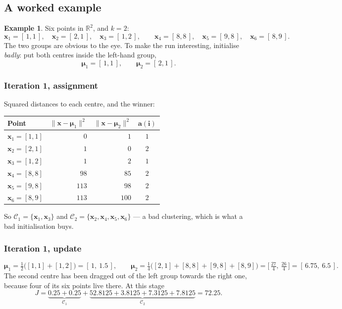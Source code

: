 \documentclass[11pt]{article}
\theoremstyle{plain}
\theoremstyle{definition}
\newtheorem{ex}{Example}[section]
\theoremstyle{remark}
\newcommand{\R}{\mathbb{R}}
\newcommand{\vc}[1]{\mathbf{#1}}
\newcommand{\norm}[1]{\lVert #1\rVert}
\newcommand{\Cl}{\mathcal{C}}
\newcommand{\bmu}{\boldsymbol{\mu}}
\begin{document}
\subsection{A worked example}
\begin{ex}
Six points in $\R^{2}$, and $k=2$:
\[
  \vc{x}_1=[\,1,1\,],\quad \vc{x}_2=[\,2,1\,],\quad \vc{x}_3=[\,1,2\,],
  \qquad
  \vc{x}_4=[\,8,8\,],\quad \vc{x}_5=[\,9,8\,],\quad \vc{x}_6=[\,8,9\,].
\]
The two groups are obvious to the eye. To make the run interesting, initialise
\emph{badly}: put both centres inside the left-hand group,
\[
  \bmu_1 = [\,1,1\,], \qquad \bmu_2 = [\,2,1\,] .
\]

\subsubsection*{Iteration 1, assignment}
Squared distances to each centre, and the winner:

\begin{center}
\renewcommand{\arraystretch}{1.2}
\begin{tabular}{@{}l r r c@{}}
\toprule
\textbf{Point} & $\norm{\vc{x}-\bmu_1}^{2}$ & $\norm{\vc{x}-\bmu_2}^{2}$
  & $\boldsymbol{a(i)}$ \\
\midrule
$\vc{x}_1=[1,1]$ & $0$   & $1$   & $1$ \\
$\vc{x}_2=[2,1]$ & $1$   & $0$   & $2$ \\
$\vc{x}_3=[1,2]$ & $1$   & $2$   & $1$ \\
$\vc{x}_4=[8,8]$ & $98$  & $85$  & $2$ \\
$\vc{x}_5=[9,8]$ & $113$ & $98$  & $2$ \\
$\vc{x}_6=[8,9]$ & $113$ & $100$ & $2$ \\
\bottomrule
\end{tabular}
\end{center}

\noindent So $\Cl_1=\{\vc{x}_1,\vc{x}_3\}$ and
$\Cl_2=\{\vc{x}_2,\vc{x}_4,\vc{x}_5,\vc{x}_6\}$ --- a bad clustering, which is
what a bad initialisation buys.

\subsubsection*{Iteration 1, update}
\[
  \bmu_1 = \tfrac12\bigl([1,1]+[1,2]\bigr) = [\,1,\ 1.5\,],
  \qquad
  \bmu_2 = \tfrac14\bigl([2,1]+[8,8]+[9,8]+[8,9]\bigr)
             = \bigl[\,\tfrac{27}{4},\ \tfrac{26}{4}\,\bigr]
             = [\,6.75,\ 6.5\,] .
\]
The second centre has been dragged out of the left group towards the right one,
because four of its six points live there. At this stage
\[
  J = \underbrace{0.25+0.25}_{\Cl_1} + \underbrace{52.8125+3.8125+7.3125+7.8125}_{\Cl_2}
    = 72.25 .
\]


\end{ex}
\end{document}
